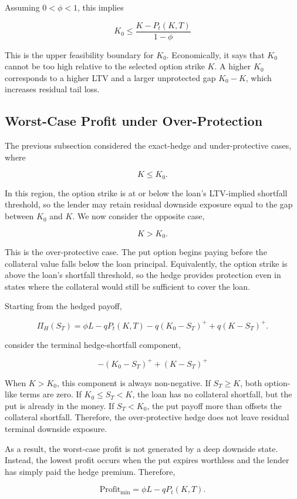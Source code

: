 \documentclass[11pt]{article}
\begin{document}
Assuming $0<\phi<1$, this implies

$$
K_0 \leq \frac{K - P_t(K,T)}{1 - \phi}
$$

This is the upper feasibility boundary for $K_0$. Economically, it says that $K_0$ cannot be too high relative to the selected option strike $K$. A higher $K_0$ corresponds to a higher LTV and a larger unprotected gap $K_0-K$, which increases residual tail loss.

\subsection{Worst-Case Profit under Over-Protection}

The previous subsection considered the exact-hedge and under-protective cases, where

$$
K \leq K_0.
$$

In this region, the option strike is at or below the loan’s LTV-implied shortfall threshold, so the lender may retain residual downside exposure equal to the gap between $K_0$ and $K$. We now consider the opposite case,

$$
K > K_0.
$$

This is the over-protective case. The put option begins paying before the collateral value falls below the loan principal. Equivalently, the option strike is above the loan’s shortfall threshold, so the hedge provides protection even in states where the collateral would still be sufficient to cover the loan.

Starting from the hedged payoff,

$$
\Pi_H(S_T)=\phi L-qP_t(K,T)-q(K_0-S_T)^++q(K-S_T)^+.
$$

consider the terminal hedge-shortfall component,

$$
-(K_0-S_T)^+ + (K-S_T)^+
$$

When $K>K_0$, this component is always non-negative. If $S_T\geq K$, both option-like terms are zero. If $K_0\leq S_T<K$, the loan has no collateral shortfall, but the put is already in the money. If $S_T<K_0$, the put payoff more than offsets the collateral shortfall. Therefore, the over-protective hedge does not leave residual terminal downside exposure.

As a result, the worst-case profit is not generated by a deep downside state. Instead, the lowest profit occurs when the put expires worthless and the lender has simply paid the hedge premium. Therefore,

$$
\text{Profit}_{\min} = \phi L - qP_t(K,T).
$$
\end{document}
